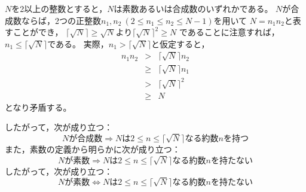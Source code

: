 \documentclass{article}
\begin{document}
$N$を2以上の整数とすると，$N$は素数あるいは合成数のいずれかである。
$N$が合成数ならば，2つの正整数$n_1, n_2\ (2 \leq n_1 \leq n_2 \leq N - 1)$を用いて
$N = n_1 n_2$と表すことができ，
$\lceil \sqrt{N} \rceil \geq \sqrt{N}$より$\lceil \sqrt{N} \rceil^2 \geq N$
であることに注意すれば，$n_1 \leq \lceil \sqrt{N} \rceil$である。
実際，$n_1 > \lceil \sqrt{N} \rceil$と仮定すると，
\begin{eqnarray*}
    n_1 n_2 &>&    \lceil \sqrt{N} \rceil n_2 \\
            &\geq& \lceil \sqrt{N} \rceil n_1 \\
            &>&    \lceil \sqrt{N} \rceil^2 \\
            &\geq& N
\end{eqnarray*}
となり矛盾する。

したがって，次が成り立つ：
\[
    \mbox{$N$が合成数} \Longrightarrow \mbox{$N$は$2 \leq n \leq \lceil \sqrt{N} \rceil$なる約数$n$を持つ}
\]
また，素数の定義から明らかに次が成り立つ：
\[
    \mbox{$N$が素数} \Longrightarrow \mbox{$N$は$2 \leq n \leq \lceil \sqrt{N} \rceil$なる約数$n$を持たない}
\]
したがって，次が成り立つ：
\[
    \mbox{$N$が素数} \Longleftrightarrow \mbox{$N$は$2 \leq n \leq \lceil \sqrt{N} \rceil$なる約数$n$を持たない}
\]
\end{document}
